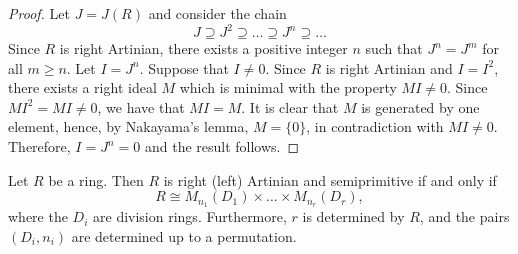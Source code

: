\begin{proof}
Let $J=J(R)$ and consider the chain
$$J\supseteq J^2\supseteq\dots\supseteq J^n\supseteq\dots$$
Since $R$ is right Artinian, there exists a positive integer $n$
such that $J^n=J^m$ for all $m\geq n$. Let $I=J^n$. Suppose that
$I\neq 0$. Since $R$ is right Artinian and $I=I^2$, there exists a right ideal $M$ which is minimal with the property
$MI\neq 0$. Since $MI^2=MI\neq 0$,
we have that $MI=M$. It is clear that $M$ is generated by one element, hence, by Nakayama's lemma, $M=\{0\}$, in contradiction with $MI\neq 0$. Therefore,
$I=J^n=0$ and the result follows.
\end{proof}

\begin{theorem}
Let $R$ be a ring. Then $R$ is right (left) Artinian and semiprimitive if and only if
$$R\cong M_{n_1}(D_1)\times \dots\times M_{n_r}(D_r),$$
where the $D_i$ are division rings. Furthermore, $r$ is determined by $R$, and the pairs $(D_i,n_i)$ are determined up to a permutation.
\end{theorem}


